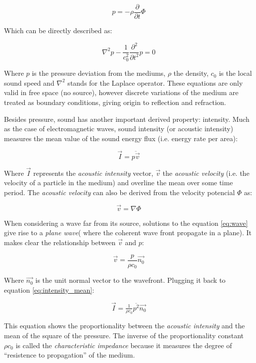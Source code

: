 \[ p =  -\rho \frac{\partial}{\partial t}\Phi \]

Which can be directly described as:

\begin{equation} \label{eq:wave}
\nabla^2 p - \frac{1}{c^2_0}\frac{\partial^2}{\partial t^2} p = 0
\end{equation} 
 
Where $p$ is the pressure deviation from the mediums, $\rho$ the density, $c_0$
is the local sound speed and $\nabla^2$ stands for the Laplace operator. These equations are
only valid in free space (no source), however discrete variations of the medium
are treated as boundary conditions, giving origin to reflection and refraction.

Besides pressure, sound has another important derived property: intensity. Much
as the case of electromagnetic waves, sound intensity (or acoustic intensity)
measures the mean value of the sound energy flux (i.e. energy rate
per area):

\begin{equation}\label{eq:intensity_mean}
\vec{I} = \overline{p\vec{v}}
\end{equation}

Where $\vec{I}$ represents the \textit{acoustic intensity} vector, $\vec{v}$ the
\textit{acoustic velocity} (i.e. the velocity of a particle in the medium) and
overline the mean over some time period. The \textit{acoustic
velocity} can also be derived from the velocity potencial $\Phi$ as:

\[ \vec{v} = \nabla \Phi\]

When considering a wave far from its source, solutions to the equation
\ref{eq:wave} give rise to a \textit{plane wave}( where the coherent wave front
propagate in a plane). It makes clear the relationship between $\vec{v}$ and
$p$:

\[ \vec{v} = \frac{p}{\rho c_0} \vec{n_0} \]

Where $\vec{n_0}$ is the unit normal vector to the wavefront. Plugging it back to
equation \ref{eq:intensity_mean}:

\begin{equation}\label{eq:intensity_pressure}
\vec{I} = \tfrac{1}{\rho c_0} \overline{p^2} \vec{n_0}
\end{equation}

This equation shows the proportionality between the \textit{acoustic
intensity} and the mean of the square of the pressure. The inverse of the
proportionality constant $\rho c_0$ is called the \textit{characteristic
impedance} because it measures the degree of ``resistence to propagation'' of
the medium.

